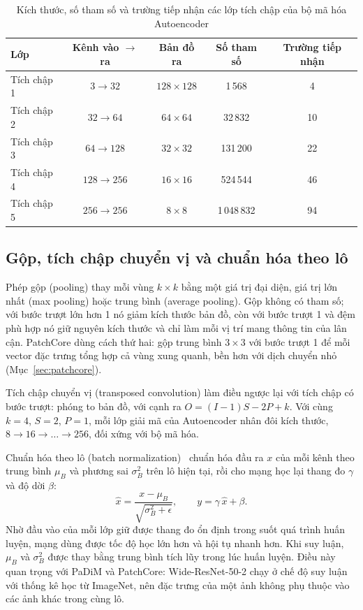 \begin{table}[htbp]
  \centering
  \caption{Kích thước, số tham số và trường tiếp nhận các lớp tích chập của bộ mã hóa Autoencoder}
  \label{tab:ae-size}
  \small
  \begin{tabular}{@{}lcccc@{}}
    \toprule
    Lớp & Kênh vào $\to$ ra & Bản đồ ra & Số tham số & Trường tiếp nhận \\
    \midrule
    Tích chập 1 & $3 \to 32$    & $128\times128$ & 1\,568   & 4 \\
    Tích chập 2 & $32 \to 64$   & $64\times64$   & 32\,832  & 10 \\
    Tích chập 3 & $64 \to 128$  & $32\times32$   & 131\,200 & 22 \\
    Tích chập 4 & $128 \to 256$ & $16\times16$   & 524\,544 & 46 \\
    Tích chập 5 & $256 \to 256$ & $8\times8$     & 1\,048\,832 & 94 \\
    \bottomrule
  \end{tabular}
\end{table}

\subsection{Gộp, tích chập chuyển vị và chuẩn hóa theo lô}

Phép gộp (pooling) thay mỗi vùng $k\times k$ bằng một giá trị đại diện, giá trị lớn nhất (max pooling) hoặc trung bình
(average pooling). Gộp không có tham số; với bước trượt lớn hơn 1 nó giảm kích thước bản đồ, còn với bước trượt 1 và
đệm phù hợp nó giữ nguyên kích thước và chỉ làm mỗi vị trí mang thông tin của lân cận. PatchCore dùng cách thứ hai:
gộp trung bình $3\times3$ với bước trượt 1 để mỗi vector đặc trưng tổng hợp cả vùng xung quanh, bền hơn với dịch
chuyển nhỏ (Mục~\ref{sec:patchcore}).

Tích chập chuyển vị (transposed convolution) làm điều ngược lại với tích chập có bước trượt: phóng to bản đồ, với cạnh
ra $O = (I-1)S - 2P + k$. Với cùng $k = 4$, $S = 2$, $P = 1$, mỗi lớp giải mã của Autoencoder nhân đôi kích thước, $8
\to 16 \to \dots \to 256$, đối xứng với bộ mã hóa.

Chuẩn hóa theo lô (batch normalization)~\cite{ioffeBatchNormalizationAccelerating2015} chuẩn hóa đầu ra $x$ của mỗi
kênh theo trung bình $\mu_B$ và phương sai $\sigma_B^2$ trên lô hiện tại, rồi cho mạng học lại thang đo $\gamma$ và
độ dời $\beta$:
\begin{equation}
  \hat{x} = \frac{x - \mu_B}{\sqrt{\sigma_B^2 + \epsilon}}, \qquad y = \gamma\, \hat{x} + \beta .
  \label{eq:bn}
\end{equation}
Nhờ đầu vào của mỗi lớp giữ được thang đo ổn định trong suốt quá trình huấn luyện, mạng dùng được tốc độ học lớn hơn
và hội tụ nhanh hơn. Khi suy luận, $\mu_B$ và $\sigma_B^2$ được thay bằng trung bình tích lũy trong lúc huấn luyện.
Điều này quan trọng với PaDiM và PatchCore: Wide-ResNet-50-2 chạy ở chế độ suy luận với thống kê học từ ImageNet, nên
đặc trưng của một ảnh không phụ thuộc vào các ảnh khác trong cùng lô.

